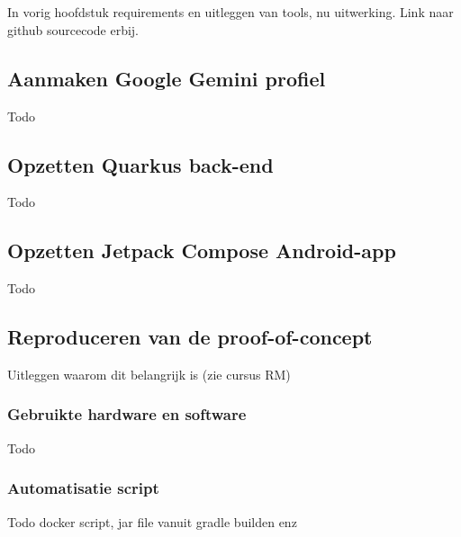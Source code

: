 
\chapter{}
\label{ch:proof-of-concept}
In vorig hoofdstuk requirements en uitleggen van tools, nu uitwerking.
Link naar github sourcecode erbij.

\section{Aanmaken Google Gemini profiel}
\label{sec:aanmaken-google-gemini-profiel}
Todo

\section{Opzetten Quarkus back-end}
\label{sec:opzetten-quarkus-back-end}
Todo

\section{Opzetten Jetpack Compose Android-app}
\label{sec:opzetten-jetpack-compose-android-app}
Todo

\section{Reproduceren van de proof-of-concept}
\label{sec:reproduceren-van-de-proof-of-concept}
Uitleggen waarom dit belangrijk is (zie cursus RM)

\subsection{Gebruikte hardware en software}
\label{subsec:gebruikte-hardware}
Todo

\subsection{Automatisatie script}
\label{subsec:automatisatie-script}
Todo docker script, jar file vanuit gradle builden enz

